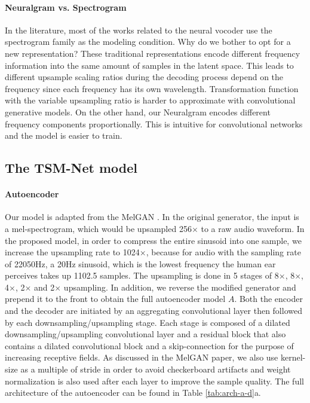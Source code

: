 \documentclass[12pt]{article}
\begin{document}
\paragraph{Neuralgram vs. Spectrogram}
In the literature, most of the works related to the neural vocoder use the spectrogram family as the modeling condition. Why do we bother to opt for a new representation? These traditional representations encode different frequency information into the same amount of samples in the latent space. This leads to different upsample scaling ratios during the decoding process depend on the frequency since each frequency has its own wavelength. Transformation function with the variable upsampling ratio is harder to approximate with convolutional generative models. On the other hand, our Neuralgram encodes different frequency components proportionally. This is intuitive for convolutional networks and the model is easier to train.

\subsection{The TSM-Net model}
\paragraph{Autoencoder}
Our model is adapted from the MelGAN \cite{kun19}. In the original generator, the input is a mel-spectrogram, which would be upsampled 256$\times$ to a raw audio waveform. In the proposed model, in order to compress the entire sinusoid into one sample, we increase the upsampling rate to 1024$\times$, because for audio with the sampling rate of 22050Hz, a 20Hz sinusoid, which is the lowest frequency the human ear perceives takes up 1102.5 samples. The upsampling is done in 5 stages of 8$\times$, 8$\times$, 4$\times$, 2$\times$ and 2$\times$ upsampling. In addition, we reverse the modified generator and prepend it to the front to obtain the full autoencoder model $A$. Both the encoder and the decoder are initiated by an aggregating convolutional layer then followed by each downsampling/upsampling stage. Each stage is composed of a dilated downsampling/upsampling convolutional layer and a residual block that also contains a dilated convolutional block and a skip-connection for the purpose of increasing receptive fields. As discussed in the MelGAN paper, we also use kernel-size as a multiple of stride in order to avoid checkerboard artifacts \cite{ode16} and weight normalization \cite{lee16} is also used after each layer to improve the sample quality. The full architecture of the autoencoder can be found in Table \ref{tab:arch-a-d}a.
\end{document}
